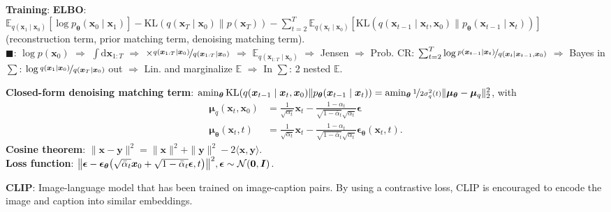 \documentclass{article}
\DeclareMathOperator*{\argmin}{amin}
\newcommand{\lft}{\mathopen{}\mathclose\bgroup\left}
\newcommand{\rgt}{\aftergroup\egroup\right}
\newcommand{\E}{\mathbb{E}}
\renewcommand{\vec}[1]{\bm{#1}}
\newcommand{\mat}[1]{\bm{#1}}
\newenvironment{topic}[1]
{\textbf{\sffamily \colorbox{black}{\rlap{\textbf{\textcolor{white}{#1}}}\hspace{\linewidth}\hspace{-2\fboxsep}}} \\ \vspace{0.2cm}}
{}
\begin{document}
\begin{multicols*}{2}
\begin{topic}{Diffusion models}
        \textbf{Training}: \textbf{ELBO}: $\E_{q(\vec{x}_1\mid \vec{x}_0)}[\log p_{\vec{\theta}}(\vec{x}_0 \mid \vec{x}_1)] - \mathrm{KL}(q(\vec{x}_T \mid \vec{x}_0) \| p(\vec{x}_T)) - \sum_{t=2}^{T} \E_{q(\vec{x}_t \mid \vec{x}_0)} [\mathrm{KL}(q(\vec{x}_{t-1} \mid \vec{x}_t, \vec{x}_0) \| p_{\vec{\theta}}(\vec{x}_{t-1} \mid \vec{x}_t))]$ (reconstruction term, prior matching term, denoising matching term). \\
        $\blacksquare$: $\log p(\vec{x}_0)$ $\Rightarrow$ $ \int \mathrm{d}\vec{x}_{1:T}$ $\Rightarrow$ $\times \nicefrac{q(\vec{x}_{1:T} \mid \vec{x}_0)}{q(\vec{x}_{1:T} \mid \vec{x}_0)}$ $\Rightarrow$ $\E_{q(\vec{x}_{1:T} \mid \vec{x}_0)}$ $\Rightarrow$ Jensen $\Rightarrow$ Prob. CR: $\sum_{t=2}^{T} \log \nicefrac{p(\vec{x}_{t-1} \mid \vec{x}_t)}{q(\vec{x}_t \mid \vec{x}_{t-1}, \vec{x}_0)}$ $\Rightarrow$ Bayes in $\sum$: $\log \nicefrac{q(\vec{x}_1 \mid \vec{x}_0)}{q(\vec{x}_T \mid \vec{x}_0)}$ out $\Rightarrow$ Lin. and marginalize $\E$ $\Rightarrow$ In $\sum$: 2 nested $\E$.

        \textbf{Closed-form denoising matching term}: $\argmin\nolimits_{\vec{\theta}} \mathrm{KL}(q(\vec{x}_{t-1} \mid \vec{x}_t, \vec{x}_0) \| p_{\vec{\theta}}(\vec{x}_{t-1} \mid \vec{x}_t)) = \argmin\nolimits_{\vec{\theta}} \nicefrac{1}{2 \sigma_q^2(t)} \| \vec{\mu}_{\vec{\theta}} - \vec{\mu}_q \|_2^2$,
        with
        \begin{align*}
            \vec{\mu}_q(\vec{x}_t, \vec{x}_0)      & = \frac{1}{\sqrt{\alpha_t}} \vec{x}_t - \frac{1-\alpha_t}{\sqrt{1-\bar{\alpha}_t} \sqrt{\alpha_t}} \vec{\epsilon}                                 \\
            \vec{\mu}_{\vec{\theta}}(\vec{x}_t, t) & = \frac{1}{\sqrt{\alpha_t}} \vec{x}_t - \frac{1 - \alpha_t}{\sqrt{1-\bar{\alpha}_t} \sqrt{\alpha_t}} \vec{\epsilon}_{\vec{\theta}}(\vec{x}_t, t).
        \end{align*}
        \textbf{Cosine theorem}: $\| \vec{x} - \vec{y} \|^2 = \| \vec{x} \|^2 + \| \vec{y} \|^2 -2 \langle \vec{x}, \vec{y} \rangle$. \\
        \textbf{Loss function}: $\lft\| \vec{\epsilon} - \vec{\epsilon}_{\vec{\theta}}\lft(
            \sqrt{\bar{\alpha}_t} \vec{x}_0 + \sqrt{1 - \bar{\alpha}_t} \vec{\epsilon}, t \rgt) \rgt\|^2,
            \vec{\epsilon} \sim \mathcal{N}(\vec{0}, \mat{I})$.

        \textbf{CLIP}: Image-language model that has been trained on image-caption pairs. By using a
        contrastive loss, CLIP is encouraged to encode the image and caption into similar embeddings.


\end{topic}
\end{multicols*}
\end{document}
